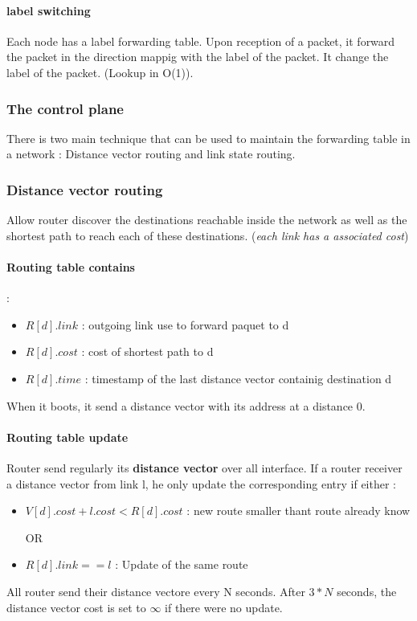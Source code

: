 \paragraph{label switching} Each node has a label forwarding table. Upon reception of a packet, it forward 
the packet in the direction mappig with the label of the packet. It change the label of the packet. (Lookup in 
O(1)).

\subsubsection{The control plane}
There is two main technique that can be used to maintain the forwarding table in
a network : Distance vector routing and link state routing.

\subsubsection{Distance vector routing}
Allow router discover the destinations reachable inside the network as well as
the shortest path to reach each of these destinations.
(\textit{each link has a associated cost})
\paragraph{Routing table contains} :
\begin{itemize}
    \item $R[d].link$ : outgoing link use to forward paquet to d
    \item $R[d].cost$ : cost of shortest path to d
    \item $R[d].time$ : timestamp of the last distance vector containig destination d
\end{itemize}
When it boots, it send a distance vector with its address at a distance 0.
\paragraph{Routing table update}
Router send regularly its \textbf{distance vector} over all interface.
If a router receiver a distance vector from link l, he only update
the corresponding entry  if either :
\begin{itemize}
    \item $V[d].cost+l.cost < R[d].cost$ : new route smaller thant route already know
    \item[OR]
    \item $R[d].link == l$ : Update of the same route
\end{itemize}
All router send their distance vectore every N seconds. After $3*N$ seconds, the distance vector cost is set to 
$\infty$ if there were no update.
